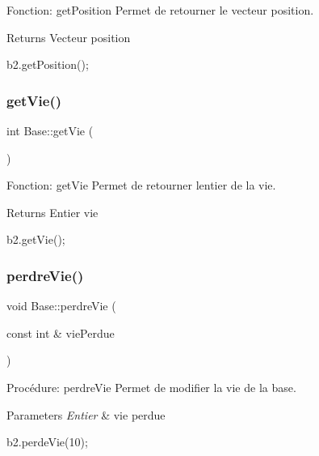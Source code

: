 Fonction\+: get\+Position Permet de retourner le vecteur position. 

\begin{DoxyReturn}{Returns}
Vecteur position 
\begin{DoxyCode}
b2.getPosition();
\end{DoxyCode}
 
\end{DoxyReturn}
\mbox{\label{classBase_a922b45a3578821dd6ab666206b1a637e}} 
\subsubsection{\texorpdfstring{get\+Vie()}{getVie()}}
{\footnotesize\ttfamily int Base\+::get\+Vie (\begin{DoxyParamCaption}{ }\end{DoxyParamCaption})}



Fonction\+: get\+Vie Permet de retourner l\textquotesingle{}entier de la vie. 

\begin{DoxyReturn}{Returns}
Entier vie 
\begin{DoxyCode}
b2.getVie();
\end{DoxyCode}
 
\end{DoxyReturn}
\mbox{\label{classBase_a0471688678ab6e2aba5ee69d290c2e20}} 
\subsubsection{\texorpdfstring{perdre\+Vie()}{perdreVie()}}
{\footnotesize\ttfamily void Base\+::perdre\+Vie (\begin{DoxyParamCaption}\item[{const int \&}]{vie\+Perdue }\end{DoxyParamCaption})}



Procédure\+: perdre\+Vie Permet de modifier la vie de la base. 


\begin{DoxyParams}{Parameters}
{\em Entier} & vie perdue 
\begin{DoxyCode}
b2.perdeVie(10);
\end{DoxyCode}
 \\
\hline
\end{DoxyParams}
\mbox{\label{classBase_afe9eb29bdaf866dc20af0b833209e29e}} 
